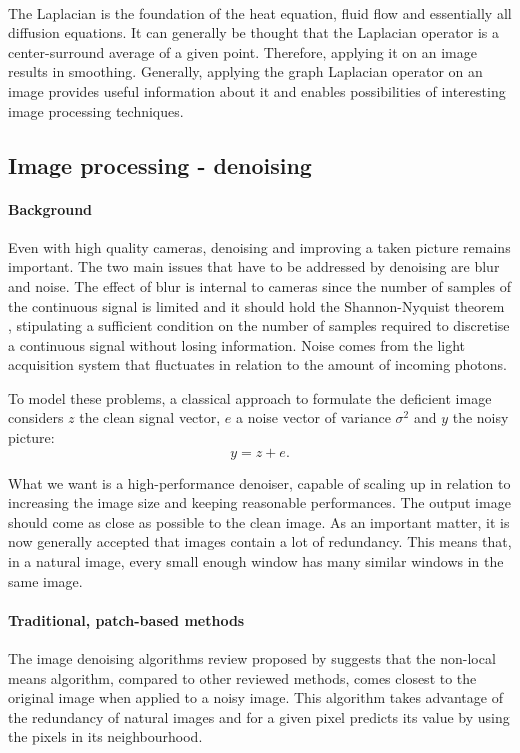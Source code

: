 \paragraph{}
The Laplacian is the foundation of the heat equation, fluid flow and essentially all diffusion equations.
It can generally be thought that the Laplacian operator is a center-surround average \cite{siam_slides_2016} of a given point.
Therefore, applying it on an image results in smoothing.
Generally, applying the graph Laplacian operator on an image provides useful information about it and enables possibilities of interesting image processing techniques.

\subsection{Image processing - denoising}

\paragraph{Background}
Even with high quality cameras, denoising and improving a taken picture remains important.
The two main issues that have to be addressed by denoising are blur and noise.
The effect of blur is internal to cameras since the number of samples of the continuous signal is limited and it should hold the Shannon-Nyquist theorem \cite{buades_review_2005}, stipulating a sufficient condition on the number of samples required to discretise a continuous signal without losing information.
Noise comes from the light acquisition system that fluctuates in relation to the amount of incoming photons.

To model these problems, a classical approach to formulate the deficient image considers \(z\) the clean signal vector, \(e\) a noise vector of variance \(\sigma^2\) and \(y\) the noisy picture:
\[y = z + e.\]

What we want is a high-performance denoiser, capable of scaling up in relation to increasing the image size and keeping reasonable performances.
The output image should come as close as possible to the clean image.
As an important matter, it is now generally accepted that images contain a lot of redundancy.
This means that, in a natural image, every small enough window has many similar windows in the same image.

\paragraph{Traditional, patch-based methods}
The image denoising algorithms review proposed by \cite{buades_review_2005} suggests that the non-local means algorithm, compared to other reviewed methods, comes closest to the original image when applied to a noisy image.
This algorithm takes advantage of the redundancy of natural images and for a given pixel predicts its value by using the pixels in its neighbourhood.


